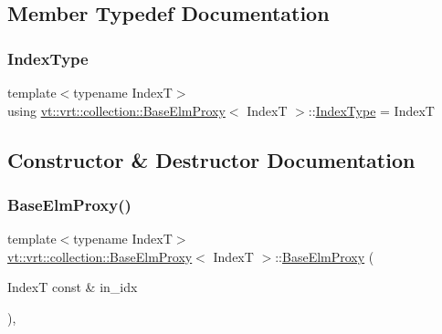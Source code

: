 \subsection{Member Typedef Documentation}
\mbox{\label{structvt_1_1vrt_1_1collection_1_1_base_elm_proxy_a3c4ff9fa4edadf3bcaf89f0eefb4c3f6}} 
\subsubsection{\texorpdfstring{Index\+Type}{IndexType}}
{\footnotesize\ttfamily template$<$typename IndexT$>$ \\
using \hyperlink{structvt_1_1vrt_1_1collection_1_1_base_elm_proxy}{vt\+::vrt\+::collection\+::\+Base\+Elm\+Proxy}$<$ IndexT $>$\+::\hyperlink{structvt_1_1vrt_1_1collection_1_1_base_elm_proxy_a3c4ff9fa4edadf3bcaf89f0eefb4c3f6}{Index\+Type} =  IndexT}



\subsection{Constructor \& Destructor Documentation}
\mbox{\label{structvt_1_1vrt_1_1collection_1_1_base_elm_proxy_a2c8be7af02f85fac3f91b02463bf1d2c}} 
\subsubsection{\texorpdfstring{Base\+Elm\+Proxy()}{BaseElmProxy()}\hspace{0.1cm}{\footnotesize\ttfamily [1/5]}}
{\footnotesize\ttfamily template$<$typename IndexT$>$ \\
\hyperlink{structvt_1_1vrt_1_1collection_1_1_base_elm_proxy}{vt\+::vrt\+::collection\+::\+Base\+Elm\+Proxy}$<$ IndexT $>$\+::\hyperlink{structvt_1_1vrt_1_1collection_1_1_base_elm_proxy}{Base\+Elm\+Proxy} (\begin{DoxyParamCaption}\item[{IndexT const \&}]{in\+\_\+idx }\end{DoxyParamCaption})\hspace{0.3cm}{\ttfamily [inline]}, {\ttfamily [explicit]}}

